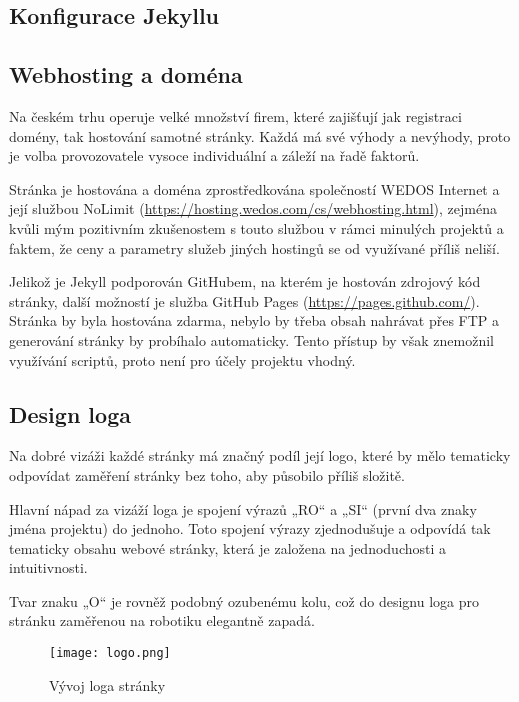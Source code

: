 \documentclass[a4paper, 12pt]{article}
\begin{document}
  \subsection{Konfigurace Jekyllu}

  \subsection{Webhosting a doména} \label{sec:Webhosting a doména}
  Na českém trhu operuje velké množství firem, které zajišťují jak registraci domény, tak hostování samotné stránky. Každá má své výhody a nevýhody, proto je volba provozovatele vysoce individuální a záleží na řadě faktorů.

  Stránka je hostována a doména zprostředkována společností WEDOS Internet a její službou NoLimit (\url{https://hosting.wedos.com/cs/webhosting.html}), zejména kvůli mým pozitivním zkušenostem s touto službou v rámci minulých projektů a faktem, že ceny a parametry služeb jiných hostingů se od využívané příliš neliší.

  Jelikož je Jekyll podporován GitHubem, na kterém je hostován zdrojový kód stránky, další možností je služba GitHub Pages (\url{https://pages.github.com/}). Stránka by byla hostována zdarma, nebylo by třeba obsah nahrávat přes FTP a generování stránky by probíhalo automaticky. Tento přístup by však znemožnil využívání scriptů, proto není pro účely projektu vhodný.


  \subsection{Design loga}
  Na dobré vizáži každé stránky má značný podíl její logo, které by mělo tematicky odpovídat zaměření stránky bez toho, aby působilo příliš složitě.

  Hlavní nápad za vizáží loga je spojení výrazů „RO“ a „SI“ (první dva znaky jména projektu) do jednoho. Toto spojení výrazy zjednodušuje a odpovídá tak tematicky obsahu webové stránky, která je založena na jednoduchosti a intuitivnosti.

  Tvar znaku „O“ je rovněž podobný ozubenému kolu, což do designu loga pro stránku zaměřenou na robotiku elegantně zapadá.

  \begin{figure}[H]
      \texttt{[image: logo.png]}
      \caption{Vývoj loga stránky} \label{img:Vývoj loga stránky}
    \endminipage
  \end{figure}
\end{document}
